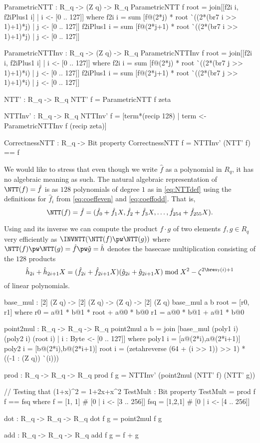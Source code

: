 \begin{code}
  ParametricNTT : R_q -> (Z q) -> R_q
  ParametricNTT f root = join[[f2i i, f2iPlus1 i] | i <- [0 .. 127]]
    where f2i i      = sum [f@(2*j)   * root ^^ ((2*(br7 i >> 1)+1)*j) | j <- [0 .. 127]]
          f2iPlus1 i = sum [f@(2*j+1) * root ^^ ((2*(br7 i >> 1)+1)*j) | j <- [0 .. 127]]

  ParametricNTTInv : R_q -> (Z q) -> R_q
  ParametricNTTInv f root = join[[f2i i, f2iPlus1 i] | i <- [0 .. 127]]
    where f2i i      = sum [f@(2*j)   * root ^^ ((2*(br7 j >> 1)+1)*i) | j <- [0 .. 127]]
          f2iPlus1 i = sum [f@(2*j+1) * root ^^ ((2*(br7 j >> 1)+1)*i) | j <- [0 .. 127]]

  NTT' : R_q -> R_q
  NTT' f = ParametricNTT f zeta
  
  NTTInv' : R_q -> R_q
  NTTInv' f = [term*(recip 128) | term <- ParametricNTTInv f (recip zeta)]
  
  CorrectnessNTT : R_q -> Bit
  property CorrectnessNTT f =  NTTInv' (NTT' f) == f
\end{code}

We would like to stress that even though we write $\hat{f}$ as a polynomial in $R_q$, it has no algebraic meaning as such.  The natural algebraic representation of $\NTT(f) = \hat{f}$ is as $128$ polynomials of degree $1$ as in \eqref{eq:NTTdef} using the definitions for $\hat{f}_i$ from \eqref{eq:coeffeven} and \eqref{eq:coeffodd}.  That is, 
$$\NTT(f) = \hat{f} = (\hat{f}_0+\hat{f}_1X,\hat{f}_2+\hat{f}_3X,\ldots,\hat{f}_{254}+\hat{f}_{255}X).$$

Using \NTT and its inverse \INVNTT we can compute the product $f\cdot g$ of
two elements $f,g \in R_q$ very efficiently as $\INVNTT(\NTT(f)\pw\NTT(g))$ where $\NTT(f) \pw \NTT(g) = \hat{f} \pw \hat{g} = \hat{h}$ denotes the basecase multiplication consisting of the $128$ products
%
\begin{equation*}
  \hat{h}_{2i} + \hat{h}_{2i + 1}X = (\hat{f}_{2i} + \hat{f}_{2i + 1}X)(\hat{g}_{2i} + \hat{g}_{2i + 1}X) \bmod X^2 - \zeta^{2\brev_7(i) + 1}
\end{equation*}
%
of linear polynomials.

\begin{code}
  base_mul : [2] (Z q) -> [2] (Z q) -> (Z q) -> [2] (Z q)
  base_mul a b root = [r0, r1]
    where
      r0 = a@1 * b@1 * root + a@0 * b@0
      r1 = a@0 * b@1 + a@1 * b@0
  
  point2mul : R_q -> R_q -> R_q
  point2mul a b = join [base_mul (poly1 i) (poly2 i) (root i) | i : Byte <- [0 .. 127]]
    where
      poly1 i = [a@(2*i),a@(2*i+1)]
      poly2 i = [b@(2*i),b@(2*i+1)]
      root i = (zeta^^(reverse (64 + (i >> 1)) >> 1) * ((-1 : (Z q)) ^^ (i)))

  prod : R_q -> R_q -> R_q
  prod f g = NTTInv' (point2mul (NTT' f) (NTT' g))

  // Testing that (1+x)^2 = 1+2x+x^2
  TestMult : Bit
  property TestMult = prod f f == fsq where
    f = [1, 1] # [0 | i <- [3 .. 256]]
    fsq = [1,2,1] # [0 | i <- [4 .. 256]]
  
  dot : R_q -> R_q -> R_q
  dot f g = point2mul f  g
  
  add : R_q -> R_q -> R_q
  add f g = f + g
\end{code}


